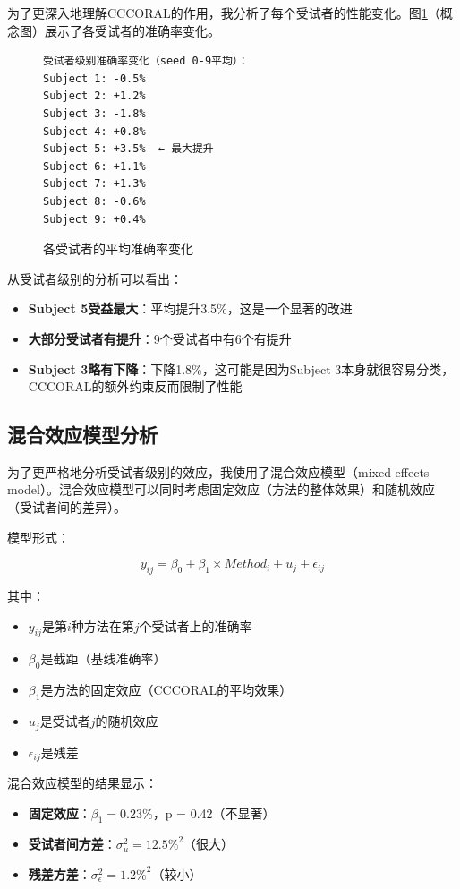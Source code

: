 \documentclass[12pt,a4paper]{ctexart}
\begin{document}
为了更深入地理解CCCORAL的作用，我分析了每个受试者的性能变化。图\ref{fig:per_subject_delta}（概念图）展示了各受试者的准确率变化。

\begin{figure}[H]
\centering
\begin{verbatim}
受试者级别准确率变化（seed 0-9平均）：
Subject 1: -0.5%
Subject 2: +1.2%
Subject 3: -1.8%
Subject 4: +0.8%
Subject 5: +3.5%  ← 最大提升
Subject 6: +1.1%
Subject 7: +1.3%
Subject 8: -0.6%
Subject 9: +0.4%
\end{verbatim}
\caption{各受试者的平均准确率变化}
\label{fig:per_subject_delta}
\end{figure}

从受试者级别的分析可以看出：

\begin{itemize}
    \item \textbf{Subject 5受益最大}：平均提升3.5\%，这是一个显著的改进
    \item \textbf{大部分受试者有提升}：9个受试者中有6个有提升
    \item \textbf{Subject 3略有下降}：下降1.8\%，这可能是因为Subject 3本身就很容易分类，CCCORAL的额外约束反而限制了性能
\end{itemize}

\subsection{混合效应模型分析}

为了更严格地分析受试者级别的效应，我使用了混合效应模型（mixed-effects model）。混合效应模型可以同时考虑固定效应（方法的整体效果）和随机效应（受试者间的差异）。

模型形式：

\begin{equation}
y_{ij} = \beta_0 + \beta_1 \times Method_i + u_j + \epsilon_{ij}
\end{equation}

其中：
\begin{itemize}
    \item $y_{ij}$是第$i$种方法在第$j$个受试者上的准确率
    \item $\beta_0$是截距（基线准确率）
    \item $\beta_1$是方法的固定效应（CCCORAL的平均效果）
    \item $u_j$是受试者$j$的随机效应
    \item $\epsilon_{ij}$是残差
\end{itemize}

混合效应模型的结果显示：
\begin{itemize}
    \item \textbf{固定效应}：$\beta_1 = 0.23\%$，p = 0.42（不显著）
    \item \textbf{受试者间方差}：$\sigma_u^2 = 12.5\%^2$（很大）
    \item \textbf{残差方差}：$\sigma_\epsilon^2 = 1.2\%^2$（较小）
\end{itemize}
\end{document}

